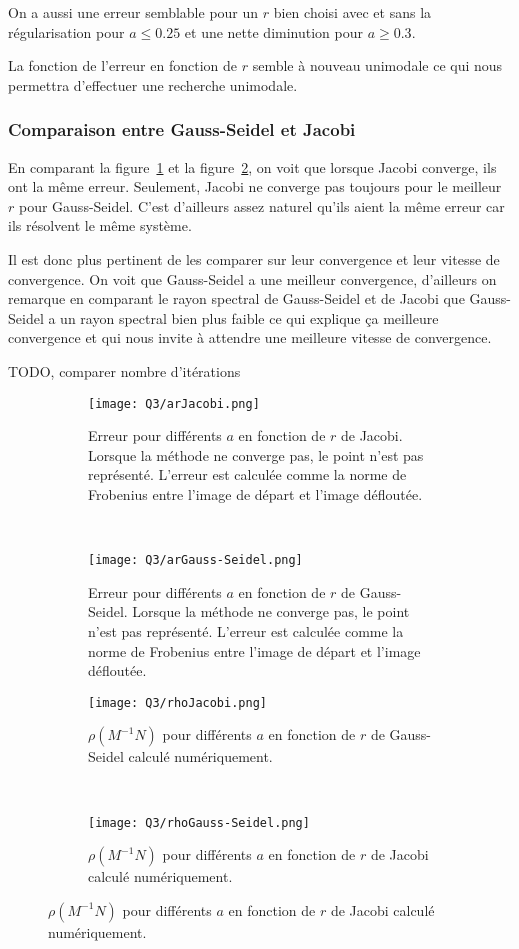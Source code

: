 On a aussi une erreur semblable pour un $r$ bien choisi
avec et sans la régularisation pour $a \leq 0.25$ et une nette
diminution pour $a \geq 0.3$.

La fonction de l'erreur en fonction de $r$ semble à nouveau unimodale
ce qui nous permettra d'effectuer une recherche unimodale.

\subsubsection{Comparaison entre Gauss-Seidel et Jacobi}
En comparant la figure~\ref{fig:arj} et la figure~\ref{fig:args}, on voit
que lorsque Jacobi converge, ils ont la même erreur.
Seulement, Jacobi ne converge pas toujours pour le meilleur $r$ pour Gauss-Seidel.
C'est d'ailleurs assez naturel qu'ils aient la même erreur car ils résolvent le même
système.

Il est donc plus pertinent de les comparer sur leur convergence et leur vitesse
de convergence.
On voit que Gauss-Seidel a une meilleur convergence,
d'ailleurs on remarque en comparant le rayon spectral de Gauss-Seidel et de Jacobi
que Gauss-Seidel a un rayon spectral bien plus faible ce qui explique ça meilleure
convergence et qui nous invite à attendre une meilleure vitesse de convergence.

TODO, comparer nombre d'itérations

\begin{figure}
  \centering
  \begin{subfigure}[b]{0.45\textwidth}
    \texttt{[image: Q3/arJacobi.png]}
    \caption{Erreur pour différents $a$ en fonction de $r$ de Jacobi.
      Lorsque la méthode ne converge pas, le point n'est pas représenté.
      L'erreur est calculée comme la norme de Frobenius entre l'image de départ
    et l'image défloutée.}
    \label{fig:arj}
  \end{subfigure}%
  ~
  \begin{subfigure}[b]{0.45\textwidth}
    \texttt{[image: Q3/arGauss-Seidel.png]}
    \caption{Erreur pour différents $a$ en fonction de $r$ de Gauss-Seidel.
      Lorsque la méthode ne converge pas, le point n'est pas représenté.
      L'erreur est calculée comme la norme de Frobenius entre l'image de départ
    et l'image défloutée.}
    \label{fig:args}
  \end{subfigure}

  \begin{subfigure}[b]{0.45\textwidth}
    \texttt{[image: Q3/rhoJacobi.png]}
    \caption{$\rho(M^{-1}N)$ pour différents $a$ en fonction de $r$ de Gauss-Seidel
    calculé numériquement.}
    \label{fig:rhoj}
  \end{subfigure}%
  ~
  \begin{subfigure}[b]{0.45\textwidth}
    \texttt{[image: Q3/rhoGauss-Seidel.png]}
    \caption{$\rho(M^{-1}N)$ pour différents $a$ en fonction de $r$ de Jacobi
    calculé numériquement.}
    \label{fig:rhogs}
  \end{subfigure}
\end{figure}
